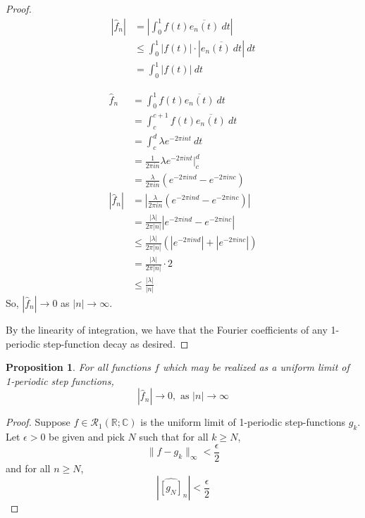 \documentclass[12pt, reqno]{amsart}
\newtheorem{prop}{Proposition}[section]
\theoremstyle{definition}
\theoremstyle{remark}
\begin{document}
\begin{itemize}
\begin{itemize}
\begin{itemize}
\begin{proof}
\begin{align*}
\left|\hat f_{n}\right|&= \left|\int_{0}^{1}f(t)\overline{e_{n}(t)}\ dt\right|\\
&\le \int_{0}^{1}|f(t)|\cdot\left|\overline{e_{n}(t)\ dt}\right|\ dt\\
&= \int_{0}^{1}|f(t)|\ dt
\end{align*}

\begin{align*}
\hat f_{n}&= \int_{0}^{1}f(t)\overline{e_{n}(t)}\ dt\\
&= \int_{c}^{c+1}f(t)\overline{e_{n}(t)}\ dt\\
&= \int_{c}^{d}\lambda e^{-2\pi int}\ dt\\
&= \frac{1}{2\pi in}\lambda e^{-2\pi int}\bigg|_{c}^{d}\\
&= \frac{\lambda}{{2\pi in}}(e^{-2\pi ind}-e^{-2\pi inc})\\
\left|\hat f_{n}\right|&= \left|\frac{\lambda}{{2\pi in}}(e^{-2\pi ind}-e^{-2\pi inc})\right|\\
&= \frac{|\lambda|}{{2\pi |n|}}\left|e^{-2\pi ind}-e^{-2\pi inc}\right|\\
&\le \frac{|\lambda|}{{2\pi |n|}}(\left|e^{-2\pi ind}\right|+\left|e^{-2\pi inc}\right|)\\
&= \frac{|\lambda|}{{2\pi|n|}}\cdot 2\\
&\le \frac{|\lambda|}{|n|}
\end{align*}
So, $|\hat f_{n}|\rightarrow 0$ as $|n| \rightarrow \infty$.


By the linearity of integration, we have that the Fourier coefficients of any 1-periodic step-function decay as desired.
\end{proof}

\begin{prop}
   For all functions $f$ which may be realized as a uniform limit of 1-periodic step functions, \[\left|\hat f_n\right|\to0,\text{ as }|n|\to\infty\]
\end{prop}

\begin{proof}
   Suppose $f\in \mathcal{R}_{1}(\mathbb{R};\mathbb{C})$ is the uniform limit of 1-periodic step-functions $g_{k}$. Let $\epsilon>0$ be given and pick $N$ such that for all $k\ge N$, $$\|f-g_{k}\|_{\infty}< \frac{\epsilon}{2}$$and for all $n\ge N$, $$\left|\widehat{[g_N]}_{n}\right|< \frac{\epsilon}{2}$$


\end{proof}
\end{itemize}
\end{itemize}
\end{itemize}
\end{document}
